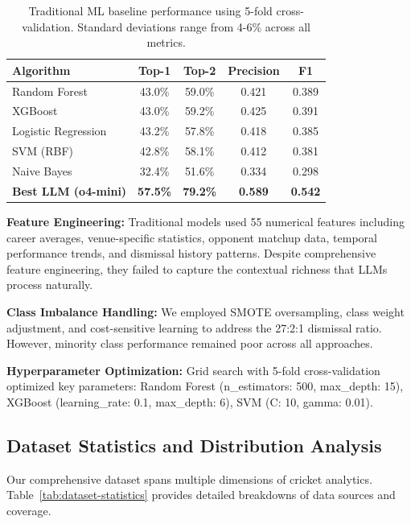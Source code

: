\documentclass[sigconf,anonymous,review]{acmart}
\begin{document}
\begin{table}[h]
\centering
\footnotesize
\renewcommand{\arraystretch}{1.2}
\begin{tabular}{lcccc}
\toprule
\textbf{Algorithm} & \textbf{Top-1} & \textbf{Top-2} & \textbf{Precision} & \textbf{F1} \\
\midrule
Random Forest & 43.0\% & 59.0\% & 0.421 & 0.389 \\
XGBoost & 43.0\% & 59.2\% & 0.425 & 0.391 \\
Logistic Regression & 43.2\% & 57.8\% & 0.418 & 0.385 \\
SVM (RBF) & 42.8\% & 58.1\% & 0.412 & 0.381 \\
Naive Bayes & 32.4\% & 51.6\% & 0.334 & 0.298 \\
\midrule
\textbf{Best LLM (o4-mini)} & \textbf{57.5\%} & \textbf{79.2\%} & \textbf{0.589} & \textbf{0.542} \\
\bottomrule
\end{tabular}
\caption{Traditional ML baseline performance using 5-fold cross-validation. Standard deviations range from 4-6\% across all metrics.}
\label{tab:traditional-details}
\end{table}

\textbf{Feature Engineering:} Traditional models used 55 numerical features including career averages, venue-specific statistics, opponent matchup data, temporal performance trends, and dismissal history patterns. Despite comprehensive feature engineering, they failed to capture the contextual richness that LLMs process naturally.

\textbf{Class Imbalance Handling:} We employed SMOTE oversampling, class weight adjustment, and cost-sensitive learning to address the 27:2:1 dismissal ratio. However, minority class performance remained poor across all approaches.

\textbf{Hyperparameter Optimization:} Grid search with 5-fold cross-validation optimized key parameters: Random Forest (n\_estimators: 500, max\_depth: 15), XGBoost (learning\_rate: 0.1, max\_depth: 6), SVM (C: 10, gamma: 0.01).

\subsection{Dataset Statistics and Distribution Analysis}
\label{subsec:dataset-stats}

Our comprehensive dataset spans multiple dimensions of cricket analytics. Table~\ref{tab:dataset-statistics} provides detailed breakdowns of data sources and coverage.
\end{document}
